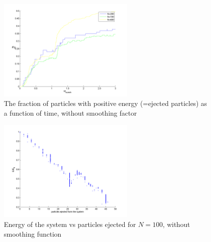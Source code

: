 \documentclass[10pt,a4paper]{article}
\begin{document}
\begin{figure}[h]
\centering
	\includegraphics[width=0.6\textwidth]{d2.png}
	\caption{The fraction of particles with positive energy (=ejected particles) as a function of time, without smoothing factor\label{d2}}
\end{figure}
\begin{figure}[h]
\centering
	\includegraphics[width=0.6\textwidth]{d3.png}
	\caption{Energy of the system vs particles ejected for $N=100$, without smoothing function\label{d3}}
\end{figure}
\end{document}
